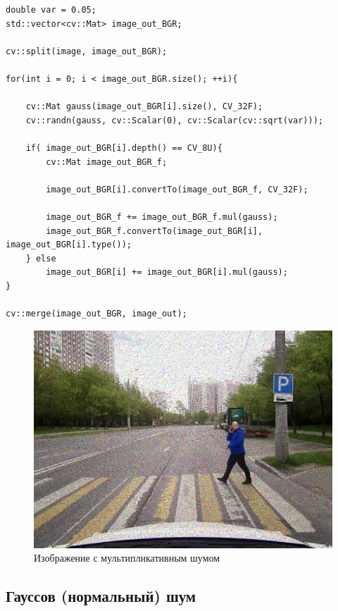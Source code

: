 \pagebreak

\begin{lstlisting}[style=cpp_white, caption={Исходный код для применения мультипликативного шума к изображению}]
double var = 0.05;
std::vector<cv::Mat> image_out_BGR;

cv::split(image, image_out_BGR);

for(int i = 0; i < image_out_BGR.size(); ++i){

    cv::Mat gauss(image_out_BGR[i].size(), CV_32F);
    cv::randn(gauss, cv::Scalar(0), cv::Scalar(cv::sqrt(var)));

    if( image_out_BGR[i].depth() == CV_8U){
        cv::Mat image_out_BGR_f;

        image_out_BGR[i].convertTo(image_out_BGR_f, CV_32F);

        image_out_BGR_f += image_out_BGR_f.mul(gauss);
        image_out_BGR_f.convertTo(image_out_BGR[i], image_out_BGR[i].type());
    } else
        image_out_BGR[i] += image_out_BGR[i].mul(gauss);
}

cv::merge(image_out_BGR, image_out);
\end{lstlisting}

\begin{figure}[ht]
    \includegraphics[width=\textwidth]{../outputs/image_mltp_noise.png}
    \caption{Изображение с мультипликативным шумом}
    \label{fig:impulse_image}
\end{figure}

\pagebreak

\subsection{Гауссов (нормальный) шум}

